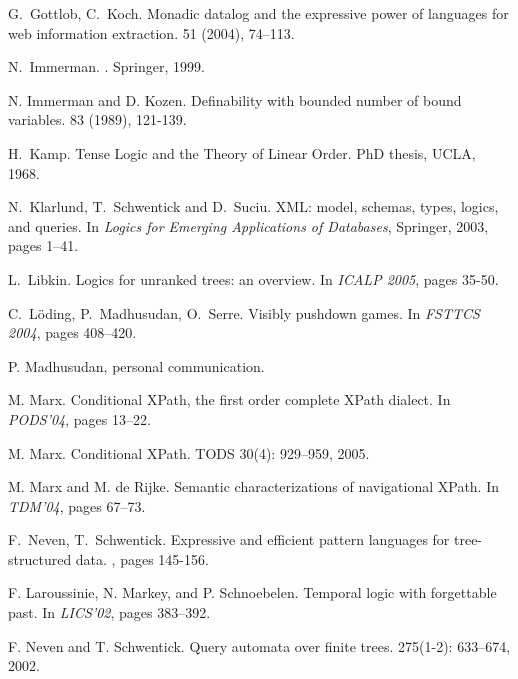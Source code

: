 \documentclass{LMCS}
\theoremstyle{plain}
\theoremstyle{definition}
\begin{document}
\begin{thebibliography}{99}
G.~Gottlob, C.~Koch.
\newblock Monadic datalog and the expressive power of languages for
web information extraction. 
 51 (2004), 74--113. 

N.~Immerman.
. \newblock Springer, 1999.

N. Immerman and D. Kozen.
\newblock Definability with bounded number
    of bound variables.  83 (1989), 121-139. 

H.~Kamp.
\newblock Tense Logic and the Theory of Linear Order.
\newblock   PhD thesis, UCLA, 1968.

N.~Klarlund, T.~Schwentick and D.~Suciu.
\newblock XML: model, schemas, types, logics, and queries.
\newblock In {\em Logics for Emerging Applications of Databases},
Springer, 2003, pages 1--41.






L.~Libkin.
\newblock Logics for unranked trees: an overview.
\newblock In {\em ICALP 2005}, pages 35-50. 

C.~L\"oding, P.~Madhusudan, O.~Serre.
\newblock Visibly pushdown games. 
\newblock In {\em FSTTCS 2004}, pages 408--420. 



 P. Madhusudan, personal communication.

M. Marx.
\newblock Conditional XPath, the first order complete XPath dialect.
\newblock In {\em PODS'04}, pages 13--22.

M. Marx.
\newblock Conditional XPath. 
\newblock TODS 30(4): 929--959, 2005.

M. Marx and M. de Rijke. 
\newblock 
Semantic characterizations of navigational XPath.
\newblock  In {\em TDM'04}, pages 67--73. 


F.~Neven, T.~Schwentick.
\newblock Expressive and efficient pattern languages for
tree-structured data. 
, pages 145-156. 


F. Laroussinie, N. Markey, and P. Schnoebelen. 
\newblock Temporal logic with forgettable past. 
\newblock In {\em LICS'02}, pages 383--392. 

F. Neven and T. Schwentick.
\newblock Query automata over finite trees. 
 275(1-2): 633--674, 2002.


\end{thebibliography}
\end{document}
